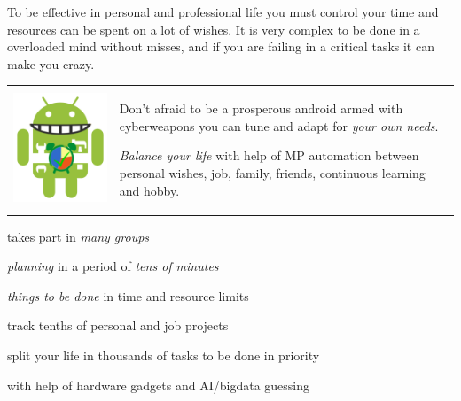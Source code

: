 
To be effective in personal and professional life you must control your time and
resources can be spent on a lot of wishes. It is very complex to be done in a
overloaded mind without misses, and if you are failing in a critical tasks it
can make you crazy.

\medskip\noindent
\begin{tabular}{p{} p{}}
\includegraphics[height=0.5\textheight,valign=t]{img/android_plan.png}
&
Don't afraid to be a prosperous android armed with cyberweapons you can tune
and adapt for \emph{your own needs}.

\medskip
\emph{Balance your life} with help of MP automation between personal wishes,
job, family, friends, continuous learning and hobby.
\\
\end{tabular}
\clearpage

\bigskip\noindent
\begin{description}[nosep]
\item[personal]  takes part in \emph{many
groups}
\item[micro] \emph{planning} in a period of \emph{tens of minutes}
\item[planning] \emph{things to be done} in time and resource limits
\item[projects] track tenths of personal and job projects
\item[tasks] split your life in thousands of tasks to be done in priority
\item[IoT] with help of hardware gadgets and AI/bigdata guessing 
\end{description}

